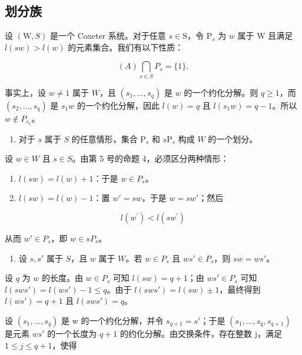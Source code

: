 \subsection{划分族}

设 \((\mathrm{W}, S)\) 是一个 Coxeter 系统。对于任意 \(s \in \mathrm{S}\)，令 \(\mathrm{P}_s\) 为 \(w\) 属于 \(\mathrm{W}\) 且满足 \(l(sw) > l(w)\) 的元素集合。我们有以下性质：

\[
(A) \bigcap_ {s \in S} P _ {s} = \{1 \}.
\]

事实上，设 \(w \neq 1\) 属于 \(W\)，且 \((s_1, \ldots, s_q)\) 是 \(w\) 的一个约化分解。则 \(q \geqslant 1\)，而 \((s_2, \ldots, s_q)\) 是 \(s_1w\) 的一个约化分解，因此 \(l(w) = q\) 且 \(l(s_1w) = q - 1\)。所以 \(w \notin P_{s_1}\)。

\begin{enumerate}
\def\labelenumi{(\Alph{enumi})}
\setcounter{enumi}{1}
\tightlist
\item
  对于 \(s\) 属于 \(S\) 的任意情形，集合 \(\mathrm{P}_s\) 和 \(s\mathrm{P}_s\) 构成 \(W\) 的一个划分。
\end{enumerate}

设 \(w \in W\) 且 \(s \in S\)。由第 5 号的命题 4，必须区分两种情形：

\begin{enumerate}
\def\labelenumi{\alph{enumi})}
\item
  \(l(sw) = l(w) + 1\)：于是 \(w \in P_s\)。
\item
  \(l(sw) = l(w) - 1\)：置 \(w' = sw\)，于是 \(w = sw'\)；然后
\end{enumerate}

\[
l (w ^ {\prime}) <   l (s w ^ {\prime})
\]

从而 \(w' \in P_s\)，即 \(w \in sP_s\)。

\begin{enumerate}
\def\labelenumi{(\Alph{enumi})}
\setcounter{enumi}{2}
\tightlist
\item
  设 \(s, s'\) 属于 \(S\)，且 \(w\) 属于 \(W\)。若 \(w \in P_s\) 且 \(ws' \in P_s\)，则 \(sw = ws'\)。
\end{enumerate}

设 \(q\) 为 \(w\) 的长度。由 \(w \in P_s\) 可知 \(l(sw) = q + 1\)；由 \(ws' \in P_s\) 可知 \(l(sws') = l(ws') - 1 \leqslant q\)。由于 \(l(sws') = l(sw) \pm 1\)，最终得到 \(l(ws') = q + 1\) 且 \(l(sws') = q\)。

设 \((s_{1},\ldots,s_{q})\) 是 w 的一个约化分解，并令 \(s_{q+1}=s'\)；于是 \((s_{1},\ldots,s_{q},s_{q+1})\) 是元素 \(ws'\) 的一个长度为 \(q+1\) 的约化分解。由交换条件，存在整数 j，满足 \(1\leqslant j\leqslant q+1\)，使得

